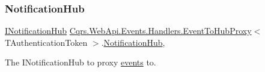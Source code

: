 \subsubsection{\texorpdfstring{Notification\+Hub}{NotificationHub}}
{\footnotesize\ttfamily \hyperlink{interfaceCqrs_1_1WebApi_1_1SignalR_1_1Hubs_1_1INotificationHub}{I\+Notification\+Hub} \hyperlink{classCqrs_1_1WebApi_1_1Events_1_1Handlers_1_1EventToHubProxy}{Cqrs.\+Web\+Api.\+Events.\+Handlers.\+Event\+To\+Hub\+Proxy}$<$ T\+Authentication\+Token $>$.\hyperlink{classCqrs_1_1WebApi_1_1SignalR_1_1Hubs_1_1NotificationHub}{Notification\+Hub}\hspace{0.3cm}{\ttfamily [get]}, {\ttfamily [protected]}}



The I\+Notification\+Hub to proxy \hyperlink{}{events} to. 

